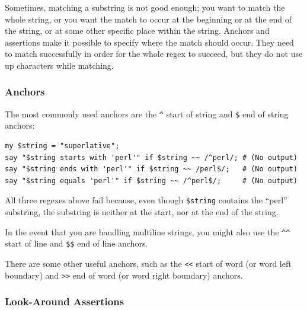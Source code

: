 Sometimes, matching a substring is not good enough; you  
want to match the whole string, or you want the match to occur 
at the beginning or at the end of the string, or at some 
other specific place within the string. Anchors and assertions 
make it possible to specify where the match should occur. 
They need to match successfully in order for the whole 
regex to succeed, but they do not use up characters 
while matching.

\subsubsection{Anchors}


The most commonly used anchors are the \verb'^' start of 
string and \verb'$' end of string anchors:

\begin{verbatim}
my $string = "superlative";
say "$string starts with 'perl'" if $string ~~ /^perl/; # (No output)
say "$string ends with 'perl'" if $string ~~ /perl$/;   # (No output)
say "$string equals 'perl'" if $string ~~ /^perl$/;     # (No output)
\end{verbatim}

All three regexes above fail because, even though 
\verb'$string' contains the ``perl'' substring, the 
substring is neither at the start, nor at the end of 
the string.

In the event that you are handling multiline strings, you might 
also use the \verb'^^' start of line and \verb'$$' end of line anchors.

There are some other useful anchors, such as the \verb'<<' 
start of word (or word left boundary) and \verb'>>' end 
of word (or word right boundary) anchors.

\subsubsection{Look-Around Assertions}


